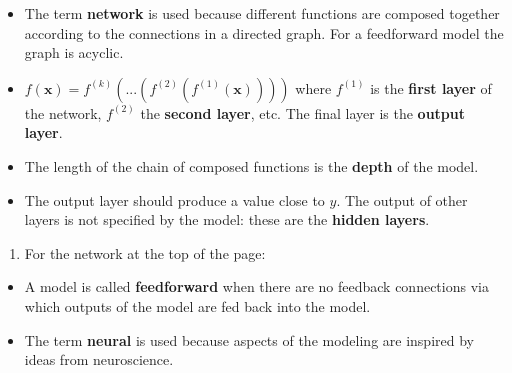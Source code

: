 \documentclass[12pt,letterpaper,noanswers]{exam}
\newcommand{\vc}[1]{\boldsymbol{#1}}
\newcommand{\note}[1]{{#1}} %
\begin{document}
\note{
\begin{tcolorbox}
\begin{itemize}
\itemsep0pt
    \item The term \textbf{network} is used because different functions are composed together according to the connections in a directed graph.  For a feedforward model the graph is acyclic.  
    \item $f(\vc{x}) = f^{(k)}(...(f^{(2)}(f^{(1)}(\vc{x}))))$ where $f^{(1)}$ is the \textbf{first layer} of the network, $f^{(2)}$ the \textbf{second layer}, etc.  The final layer is the \textbf{output layer}.
    \item The length of the chain of composed functions is the \textbf{depth} of the model.
    \item The output layer should produce a value close to $y$.  The output of other layers is not specified by the model: these are the \textbf{hidden layers}.
\end{itemize}
\end{tcolorbox}
}
\begin{enumerate}[resume=classQ]
\item For the network at the top of the page:
\end{enumerate}
\note{
\begin{tcolorbox}
\begin{itemize}
\itemsep0pt
    \item A model is called \textbf{feedforward} when there are no feedback connections via which outputs of the model are fed back into the model.
    
    \item The term \textbf{neural} is used because aspects of the modeling are inspired by ideas from neuroscience.
\end{itemize}
\end{tcolorbox}
}
\renewcommand{\inputnum}{2} 
\renewcommand{\hiddennum}{2}  
\renewcommand{\outputnum}{1} 
 
\end{document}
